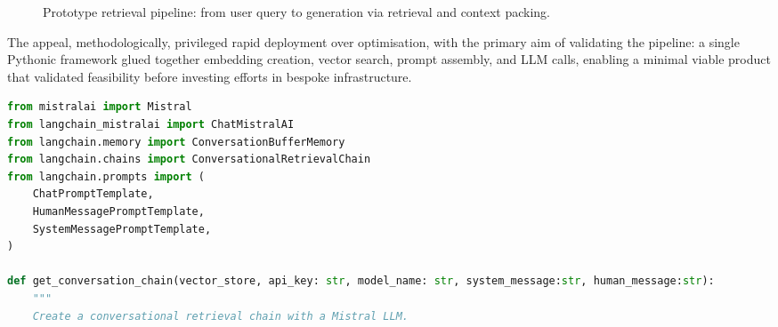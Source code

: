 \begin{spacing}{1.5}
\vspace{0.8em}
\begin{figure}[H]
\centering
\begin{adjustbox}{max width=\linewidth}
\end{adjustbox}
\caption{Prototype retrieval pipeline: from user query to generation via retrieval and context packing.}
\label{fig:prototype-pipeline}
\end{figure}

The appeal, methodologically, privileged rapid deployment over optimisation, with the primary aim of validating the pipeline: a single Pythonic framework glued together embedding creation, vector search, prompt assembly, and LLM calls, enabling a minimal viable product that validated feasibility before investing efforts in bespoke infrastructure.


\begin{lstlisting}[language=Python, 
                  breaklines=true,
                  frame=none, 
                  showspaces=false,
                  showstringspaces=false,
                  showtabs=false,
                  caption={Usage example of the stuff method from LangChain.}, 
                  captionpos=b, 
                  label={lst:stuff-method},
                  xleftmargin=0.05\textwidth,
                  xrightmargin=0\textwidth]
from mistralai import Mistral
from langchain_mistralai import ChatMistralAI
from langchain.memory import ConversationBufferMemory
from langchain.chains import ConversationalRetrievalChain
from langchain.prompts import (
    ChatPromptTemplate,
    HumanMessagePromptTemplate,
    SystemMessagePromptTemplate,
)

def get_conversation_chain(vector_store, api_key: str, model_name: str, system_message:str, human_message:str):
    """
    Create a conversational retrieval chain with a Mistral LLM.


\end{lstlisting}
\end{spacing}
